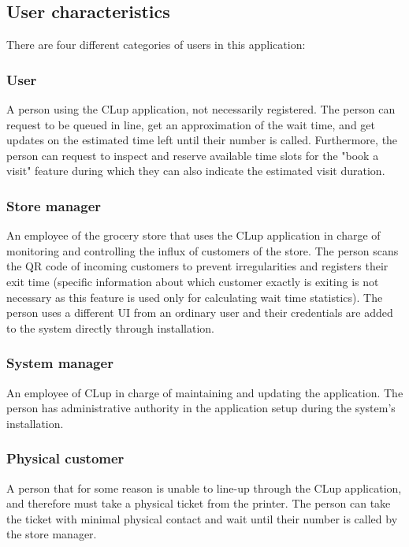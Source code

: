 \newpage

\subsection{User characteristics}
\hspace{\parindent} There are four different categories of users in this application:

\subsubsection{User}
\hspace{\parindent}A person using the CLup application, not necessarily registered. The person can request to be queued in line, get an approximation of the wait time, and get updates on the estimated time left until their number is called. Furthermore, the person can request to inspect and reserve available time slots for the "book a visit" feature during which they can also indicate the estimated visit duration. 
\subsubsection{Store manager}
\hspace{\parindent}An employee of the grocery store that uses the CLup application in charge of monitoring and controlling the influx of customers of the store. The person scans the QR code of incoming customers to prevent irregularities and registers their exit time (specific information about which customer exactly is exiting is not necessary as this feature is used only for calculating wait time statistics). The person uses a different UI from an ordinary user and their credentials are added to the system directly through installation. 
\subsubsection{System manager}
\hspace{\parindent}An employee of CLup in charge of maintaining and updating the application. The person has administrative authority in the application setup during the system's installation. 
\subsubsection{Physical customer}
\hspace{\parindent}A person that for some reason is unable to line-up through the CLup application, and therefore must take a physical ticket from the printer. The person can take the ticket with minimal physical contact and wait until their number is called by the store manager. 

